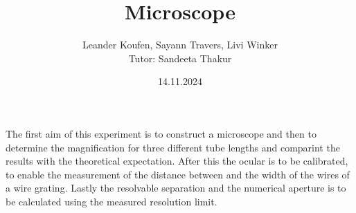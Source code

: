 \documentclass[fontsize=11pt, paper=a4, DIV=12]{scrartcl}
\title{Microscope}
\date{14.11.2024}
\author{Leander Koufen, Sayann Travers, Livi Winker\\
Tutor: Sandeeta Thakur}
\begin{document}
\maketitle

\tableofcontents
\clearpage

The first aim of this experiment is to construct a microscope and then to determine the magnification for three different tube lengths
and comparint the results with the theoretical expectation. After this the ocular is to be calibrated, to enable the measurement of the
distance between and the width of the wires of a wire grating.
Lastly the resolvable separation and the numerical aperture is to be calculated using the measured resolution limit.

\newpage








\end{document}
